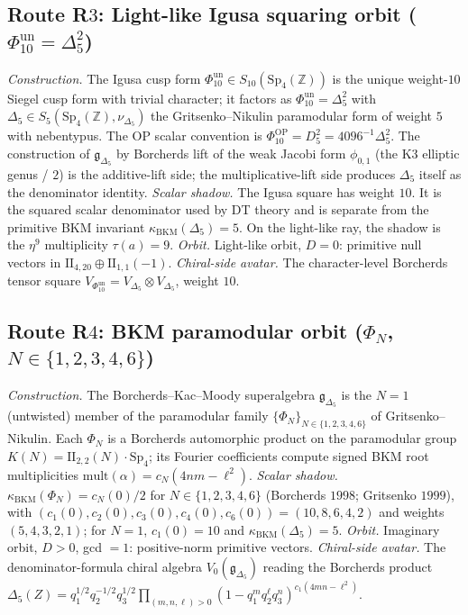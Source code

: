\documentclass[11pt]{article}
\begin{document}
\subsection{Route R$3$: Light-like Igusa squaring orbit
($\Phi_{10}^{\mathrm{un}} = \Delta_5^2$)}
\label{subsec:R3-igusa}

\emph{Construction.} The Igusa cusp form
$\Phi_{10}^{\mathrm{un}} \in S_{10}(\mathrm{Sp}_4(\mathbb Z))$ is the unique
weight-$10$ Siegel cusp form with trivial character; it factors
as $\Phi_{10}^{\mathrm{un}} = \Delta_5^2$ with $\Delta_5 \in
S_5(\mathrm{Sp}_4(\mathbb Z), \nu_{\Delta_5})$ the
Gritsenko--Nikulin paramodular form of weight $5$ with
nebentypus. The OP scalar convention is
$\Phi_{10}^{\mathrm{OP}}=D_5^2=4096^{-1}\Delta_5^2$.
The construction of $\mathfrak g_{\Delta_5}$
by Borcherds lift of the weak Jacobi form $\phi_{0,1}$
(the K3 elliptic genus / $2$) is the additive-lift side;
the multiplicative-lift side produces $\Delta_5$ itself
as the denominator identity.
\emph{Scalar shadow.}
The Igusa square has weight $10$. It is the squared scalar
denominator used by DT theory and is separate from the primitive
BKM invariant $\kappa_{\mathrm{BKM}}(\Delta_5)=5$. On the
light-like ray, the shadow is the $\eta^9$ multiplicity
$\tau(a) = 9$.
\emph{Orbit.} Light-like orbit, $D = 0$: primitive null vectors
in $\mathrm{II}_{4,20} \oplus \mathrm{II}_{1,1}(-1)$.
\emph{Chiral-side avatar.} The character-level Borcherds tensor
square $V_{\Phi_{10}^{\mathrm{un}}}
= V_{\Delta_5} \otimes V_{\Delta_5}$, weight $10$.

\subsection{Route R$4$: BKM paramodular orbit ($\Phi_N$, $N \in \{1,2,3,4,6\}$)}
\label{subsec:R4-BKM}

\emph{Construction.} The Borcherds--Kac--Moody superalgebra
$\mathfrak g_{\Delta_5}$ is the $N = 1$ (untwisted) member of
the paramodular family $\{\Phi_N\}_{N \in \{1, 2, 3, 4, 6\}}$
of Gritsenko--Nikulin. Each $\Phi_N$ is a Borcherds
automorphic product on the paramodular group
$K(N) = \mathrm{II}_{2,2}(N) \cdot \mathrm{Sp}_4$; its Fourier
coefficients compute signed BKM root multiplicities
$\mathrm{mult}(\alpha) = c_N(4nm - \ell^2)$.
\emph{Scalar shadow.}
$\kappa_{\mathrm{BKM}}(\Phi_N) = c_N(0)/2$ for $N \in \{1, 2, 3, 4, 6\}$
(Borcherds $1998$; Gritsenko $1999$), with
$(c_1(0),c_2(0),c_3(0),c_4(0),c_6(0))=(10,8,6,4,2)$ and weights
$(5,4,3,2,1)$; for $N = 1$,
$c_1(0) = 10$ and $\kappa_{\mathrm{BKM}}(\Delta_5) = 5$.
\emph{Orbit.} Imaginary orbit, $D > 0$, gcd $= 1$: positive-norm
primitive vectors.
\emph{Chiral-side avatar.} The denominator-formula chiral algebra
$V_0(\mathfrak g_{\Delta_5})$ reading the Borcherds product
$\Delta_5(Z) = q_1^{1/2} q_2^{-1/2} q_3^{1/2}
\prod_{(m,n,\ell) > 0} (1 - q_1^m q_2^\ell q_3^n)^{c_1(4mn - \ell^2)}$.
\end{document}
